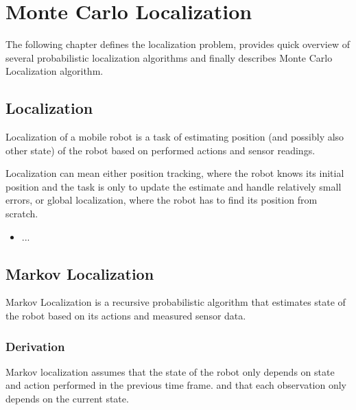 \chapter{Monte Carlo Localization}
\label{chap:mcl}

The following chapter defines the localization problem, provides quick overview
of several probabilistic localization algorithms and finally describes
Monte Carlo Localization algorithm.

\section{Localization}
Localization of a mobile robot is a task of estimating position (and possibly
also other state) of the robot based on performed actions and sensor readings.

Localization can mean either position tracking, where the robot knows its initial
position and the task is only to update the estimate and handle relatively small
errors, or global localization, where the robot has to find its position from scratch.

\begin{itemize}
\item ...
\end{itemize}

\section{Markov Localization}

Markov Localization \cite{fox98,diard} is a recursive probabilistic
algorithm that estimates state of the robot based on its actions and measured sensor data.

\subsection{Derivation}

Markov localization assumes that the state of the robot only depends
on state and action performed in the previous time frame.
and that each observation only depends on the current state.

